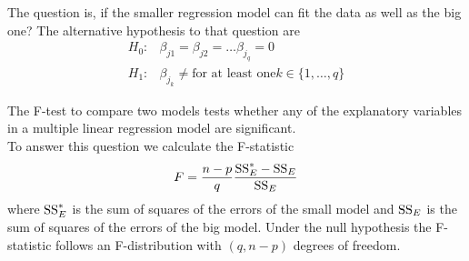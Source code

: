 The question is, if the smaller regression model can fit the data as well as the big one? The alternative hypothesis to that question are
\begin{equation}
  \begin{split}
    H_0:& \beta_{j1} = \beta_{j2} = \dots \beta_{j_q} = 0\\
    H_1:& \beta_{j_k} \neq \text{for at least one} k \in \{1,\dots,q\}
  \end{split}
\end{equation}

The F-test to compare two models tests whether any of the explanatory variables in a multiple linear regression model are significant.\\
To answer this question we calculate the F-statistic
\begin{equation}
  F = \frac{n-p}{q}\frac{\textup{SS}^*_E - \textup{SS}_E}{\textup{SS}_E}
\end{equation}
where $\textup{SS}^*_E$ is the sum of squares of the errors of the small model and $\textup{SS}_E$ is the sum of squares of the errors of the big model. Under the null hypothesis the F-statistic follows an F-distribution with $(q, n - p)$ degrees of freedom.
